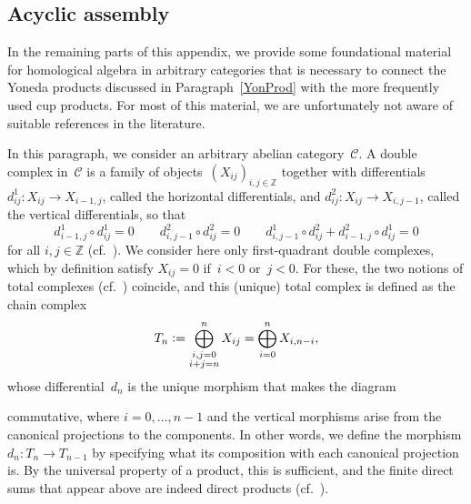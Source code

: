 \documentclass[12pt]{article}
\theoremstyle{definition}
\theoremstyle{break}
\newcommand{\Z}{\mathbb{Z}}
\newcommand{\CC}{\mathcal{C}}
\renewcommand{\1}{\mathbbm{1}}
\newcommand{\deq}{\vcentcolon =}
\begin{document}
\subsection{Acyclic assembly} \label{AcyclAss}
In the remaining parts of this appendix, we provide some foundational material for homological algebra in arbitrary categories that is necessary to connect the Yoneda products discussed in Paragraph~\ref{YonProd} with the more frequently used cup products. For most of this material, we are unfortunately not aware of suitable references in the literature.

In this paragraph, we consider an arbitrary abelian category~$\CC$. A double complex in~$\CC$ is a family of objects~$(X_{ij})_{i,j \in \Z}$ together with differentials
$d^1_{ij} \colon X_{ij} \to X_{i-1,j}$, called the horizontal differentials, and
$d^2_{ij} \colon X_{ij} \to X_{i,j-1}$, called the vertical differentials, so that
\[d^1_{i-1,j} \circ d^1_{ij} = 0 \qquad d^2_{i,j-1} \circ d^2_{ij} = 0
\qquad d^1_{i,j-1} \circ d^2_{ij} + d^2_{i-1,j} \circ d^1_{ij} = 0\]
for all $i,j \in \Z$ (cf.~\cite[Examp.~1.2.4, p.~7]{We}). We consider here only first-quadrant double complexes, which by definition satisfy $X_{ij} = 0$ if~$i < 0$ or~$j < 0$. For these, the two notions of total complexes (cf.~\cite[Examp.~1.2.6, p.~8]{We}) coincide, and this (unique) total complex is defined as the chain complex
\[T_n \deq \bigoplus_{\substack{i,j=0 \\i+j=n}}^n X_{ij} =
\bigoplus_{i=0}^n X_{i,n-i},\]
whose differential~$d_n$ is the unique morphism that makes the diagram
\begin{center}
\end{center}
commutative, where $i=0,\dots,n-1$ and the vertical morphisms arise from the canonical projections to the components. In other words, we define the morphism
\mbox{$d_n \colon T_n \to T_{n-1}$} by specifying what its composition with each canonical projection is. By the universal property of a product, this is sufficient, and the finite direct sums that appear above are indeed direct products (cf.~\cite[Chap.~II, Prop.~9.1, p.~76]{HiS}).
\end{document}
